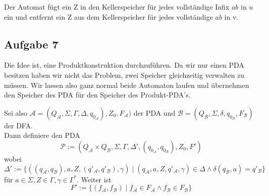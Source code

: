 \documentclass[a4paper,graphics,11pt]{article}
\newcommand{\aufgabe}[1]{\subsection*{Aufgabe #1}}
\begin{document}
Der Automat fügt ein Z in den Kellerspeicher für jedes vollständige Infix $ab$ in $u$ ein und entfernt ein Z aus dem Kellerspeicher für jedes vollständige $ab$ in v.

\newpage

\aufgabe{7}
Die Idee ist, eine Produktkonstruktion durchzuführen. Da wir nur einen PDA besitzen haben wir nicht das Problem,
zwei Speicher gleichzeitig verwalten zu müssen. Wir lassen also ganz normal beide Automaton laufen
und übernehmen den Speicher des PDA für den Speicher des Produkt-PDA's.

Sei also $\mathcal{A} = (Q_\mathcal{A}, \Sigma, \Gamma, \Delta, q_{0_\mathcal{A}}), Z_0, F_\mathcal{A})$
der PDA
und $\mathcal{B} = (Q_\mathcal{B}, \Sigma, \delta, q_{0_\mathcal{B}}, F_\mathcal{B})$ der DFA.\\
Dann definiere den PDA
$$
    \mathcal{P} := (Q_\mathcal{A} \times Q_\mathcal{B}, \Sigma, \Gamma, \Delta', (q_{0_\mathcal{A}}, q_{0_\mathcal{B}}), Z_0, F')
$$
wobei
$$
    \Delta' := \{((q_\mathcal{A}, q_\mathcal{B}), a, Z, (q'_\mathcal{A}, q'_\mathcal{B}), \gamma)
    \mid (q_\mathcal{A}, a, Z, q'_\mathcal{A}, \gamma) \in \Delta \land \delta(q_\mathcal{B}, a) = q'_\mathcal{B}\}
$$
für $a \in \Sigma, Z \in \Gamma, \gamma \in \Gamma^*$.
Weiter ist
$$
    F' := \{(f_\mathcal{A},f_\mathcal{B}) \mid f_\mathcal{A} \in F_\mathcal{A} \land f_\mathcal{B} \in F_\mathcal{B}\}
$$
\end{document}
